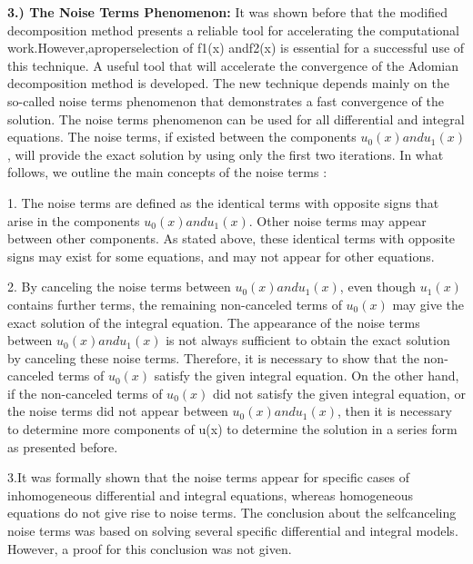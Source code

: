 \documentclass[12pt]{article}
\begin{document}
\textbf{3.)		The Noise Terms Phenomenon:}
It was shown before that the modiﬁed decomposition method presents a reliable tool for accelerating the computational work.However,aproperselection of f1(x) andf2(x) is essential for a successful use of this technique. A useful tool that will accelerate the convergence of the Adomian decomposition method is developed. The new technique depends mainly on the so-called noise terms phenomenon that demonstrates a fast convergence of the solution. The noise terms phenomenon can be used for all diﬀerential and integral equations. The noise terms, if existed between the components $u_0(x) and u_1(x)$, will provide the exact solution by using only the ﬁrst two iterations. In what follows, we outline the main concepts of the noise terms : \\
\par 1. The noise terms are deﬁned as the identical terms with opposite signs that arise in the components $u_0(x) and u_1(x)$. Other noise terms may appear between other components. As stated above, these identical terms with opposite signs may exist for some equations, and may not appear for other equations.
\par 2. By canceling the noise terms between $u_0(x) and u_1(x)$, even though $u_1(x)$ contains further terms, the remaining non-canceled terms of $u_0(x)$ may give the exact solution of the integral equation. The appearance of the noise terms between $u_0(x) and u_1(x)$ is not always suﬃcient to obtain the exact solution by canceling these noise terms. Therefore, it is necessary to show that the non-canceled terms of $u_0(x)$ satisfy the given integral equation. On the other hand, if the non-canceled terms of $u_0(x)$ did not satisfy the given integral equation, or the noise terms did not appear between $u_0(x) and u_1(x)$, then it is necessary to determine more components of u(x) to determine the solution in a series form as presented before. 
\par 3.It was formally shown that the noise terms appear for speciﬁc cases of inhomogeneous diﬀerential and integral equations, whereas homogeneous equations do not give rise to noise terms. The conclusion about the selfcanceling noise terms was based on solving several speciﬁc diﬀerential and integral models. However, a proof for this conclusion was not given.\\
\end{document}
